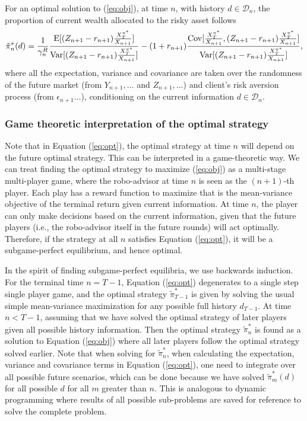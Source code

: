 \begin{theorem}\label{thm:optimal} For an optimal solution to (\ref{eq:obj}), at time $n$, with history $d\in \mathcal{D}_n$, the proportion of current wealth allocated to the risky asset follows
    \begin{equation}\label{eq:opt}
    \tilde\pi_n^*(d)=\frac{1}{\gamma_n^R} \frac{\mathrm{E}[(Z_{n+1}-r_{n+1})\frac{X_T^{\pi^*}}{X_{n+1}}]}{\mathrm{Var}[(Z_{n+1}-r_{n+1})\frac{X_T^{\pi^*}}{X_{n+1}}]}-(1+r_{n+1})\frac{\mathrm{Cov}[\frac{X_T^{\pi^*}}{X_{n+1}},(Z_{n+1}-r_{n+1})\frac{X_T^{\pi^*}}{X_{n+1}}]}{\mathrm{Var}[(Z_{n+1}-r_{n+1})\frac{X_T^{\pi^*}}{X_{n+1}}]},
\end{equation} where all the expectation, variance and covariance are taken over the randomness of the future market (from $Y_{n+1},\ldots$ and $Z_{n+1},\ldots$) and client's risk aversion process (from $\epsilon_{n+1}\ldots$), conditioning on the current information $d\in\mathcal{D}_n$.
\end{theorem}

\subsubsection{Game theoretic interpretation of the optimal strategy}

Note that in Equation (\ref{eq:opt}), the optimal strategy at time $n$ will depend on the future optimal strategy. This can be interpreted in a game-theoretic way. We can treat finding the optimal strategy to maximize (\ref{eq:obj}) as a multi-stage multi-player game, where the robo-advisor at time $n$ is seen as the $(n+1)$-th player. Each play has a reward function to maximize that is the mean-variance objective of the terminal return given current information. At time $n$, the player can only make decisions based on the current information, given that the future players (i.e., the robo-advisor itself in the future rounds) will act optimally. Therefore, if the strategy at all $n$ satisfies Equation (\ref{eq:opt}), it will be a subgame-perfect equilibrium, and hence optimal.

In the spirit of finding subgame-perfect equilibria, we use backwards induction. For the terminal time $n=T-1$, Equation (\ref{eq:opt}) degenerates to a single step single player game, and the optimal strategy $\tilde\pi_{T-1}^*$ is given by solving the usual simple mean-variance maximization for any possible full history $d_{T-1}$. At time $n<T-1$, assuming that we have solved the optimal strategy of later players given all possible history information. Then the optimal strategy $\tilde\pi_n^*$ is found as a solution to Equation (\ref{eq:obj}) where all later players follow the optimal strategy solved earlier. Note that when solving for $\tilde\pi_n^*$, when calculating the expectation, variance and covariance terms in Equation (\ref{eq:opt}), one need to integrate over all possible future scenarios, which can be done because we have solved $\tilde\pi_m^*(d)$ for all possible $d$ for all $m$ greater than $n$. This is analogous to dynamic programming where results of all possible sub-problems are saved for reference to solve the complete problem.

